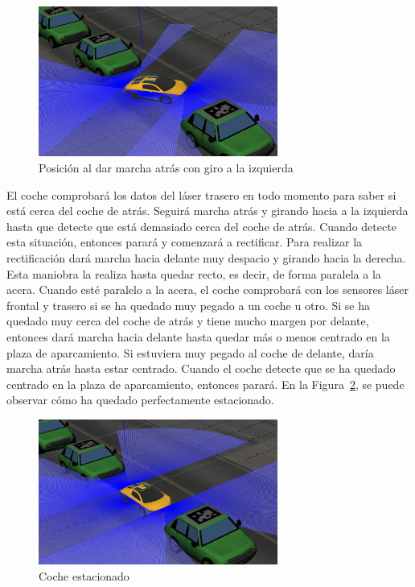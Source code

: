 \begin{figure}[H]
  \begin{center}
    \includegraphics[width=0.7\textwidth]{figures/Autopark/Posicion4.png}
		\caption{Posición al dar marcha atrás con giro a la izquierda}
		\label{fig.Posicion4}
		\end{center}
\end{figure}

El coche comprobará los datos del láser trasero en todo momento para saber si está cerca del coche de atrás. Seguirá marcha atrás y girando hacia a la izquierda hasta que detecte que está demasiado cerca del coche de atrás. Cuando detecte esta situación, entonces parará y comenzará a rectificar. Para realizar la rectificación dará marcha hacia delante muy despacio y girando hacia la derecha. Esta maniobra la realiza hasta quedar recto, es decir, de forma paralela a la acera. Cuando esté paralelo a la acera, el coche comprobará con los sensores láser frontal y trasero si se ha quedado muy pegado a un coche u otro. Si se ha quedado muy cerca del coche de atrás y tiene mucho margen por delante, entonces dará marcha hacia delante hasta quedar más o menos centrado en la plaza de aparcamiento. Si estuviera muy pegado al coche de delante, daría marcha atrás hasta estar centrado. Cuando el coche detecte que se ha quedado centrado en la plaza de aparcamiento, entonces parará. En la Figura~\ref{fig.Posicion5}, se puede observar cómo ha quedado perfectamente estacionado.

\begin{figure}[H]
  \begin{center}
    \includegraphics[width=0.7\textwidth]{figures/Autopark/Posicion5.png}
		\caption{Coche estacionado}
		\label{fig.Posicion5}
		\end{center}
\end{figure}


